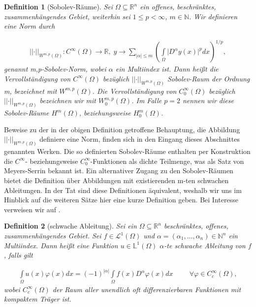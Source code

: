\documentclass[bibliography=totoc,12pt,a4paper]{scrartcl}
\theoremstyle{exampstyle}
\newtheorem{defi}{Definition}%
\numberwithin{equation}{section}
\begin{document}
\begin{defi}[Sobolev-Räume]\label{Sobolevspace}
Sei $\Omega \subseteq \mathbb{R}^n$ ein offenes, beschränktes, zusammenhängendes Gebiet, weiterhin sei $1 \leq p < \infty$, $m \in \mathbb{N}$. Wir definieren eine Norm durch

\begin{align*}
	\vert\vert \cdot \vert\vert_{W^{m,p}(\Omega)}: C^\infty(\Omega) \rightarrow 
	\mathbb{R},\; y \rightarrow \underset{\vert \alpha \vert \leq m}{\sum} 						\left(\underset{\Omega}{\int} \vert D^\alpha y(x) \vert ^p dx\right)^{1/p},
\end{align*}
genannt \textit{m,p-Sobolev-Norm}, wobei $\alpha$ ein Multiindex ist. Dann heißt die Vervollständigung von $C^\infty(\Omega)$ bezüglich $\vert\vert \cdot \vert\vert_{W^{m,p}(\Omega)}$ \textit{Sobolev-Raum der Ordnung m}, bezeichnet mit $W^{m,p}(\Omega)$. Die Vervollständigung von $C_0^\infty(\Omega)$ bezüglich $\vert\vert \cdot \vert\vert_{W^{m,p}(\Omega)}$ bezeichnen wir mit $W_0^{m,p}(\Omega)$. Im Falle $p=2$ nennen wir diese Sobolev-Räume $H^m(\Omega)$, beziehungsweise  $H_0^m(\Omega)$.
\end{defi}

Beweise zu der in der obigen Definition getroffene Behauptung, die Abbildung $\vert\vert \cdot \vert\vert_{W^{m,p}(\Omega)}$ definiere eine Norm, finden sich in den Eingang dieses Abschnittes genannten Werken. Die so definierten Sobolev-Räume enthalten per Konstruktion die $C^\infty$- beziehungsweise $C_0^\infty$-Funktionen als dichte Teilmenge, was als Satz von Meyers-Serrin bekannt ist. Ein alternativer Zugang zu den Sobolev-Räumen bietet die Definition über Abbildungen mit existierenden m-ten schwachen Ableitungen. In der Tat sind diese Definitionen äquivalent, weshalb wir uns im Hinblick auf die weiteren Sätze hier eine kurze Definition geben. Bei Interesse verweisen wir auf \cite{PDE2}.

\begin{defi}[schwache Ableitung]
Sei ein $\Omega \subseteq \mathbb{R}^n$ beschränktes, offenes, zusammenhängendes Gebiet. Sei $f\in \mathcal{L}^1(\Omega)$ und $\alpha = (\alpha_1,\dots, \alpha_n)\in \mathbb{N}^n$ ein Multiindex. 
Dann heißt eine Funktion $u \in \mathbb{L}^1(\Omega)$ \textit{ $\alpha$-te schwache Ableitung} von $f$, falls gilt

\begin{align*}
	\underset{\Omega}{\int}u(x)\varphi(x)dx = (-1)^{\vert \alpha \vert}\underset{\Omega}{\int}f(x)D^\alpha\varphi(x)dx \hspace{1cm} \forall \varphi \in C_c^\infty(\Omega),
\end{align*}
wobei $C_c^\infty(\Omega)$ der Raum aller unendlich oft differenzierbaren Funktionen mit kompaktem Träger ist.
\end{defi}
\end{document}
